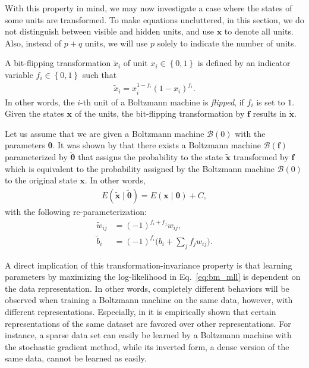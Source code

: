 \documentclass[dissertation,nocontribution,draft*]{aaltoseries}
\newcommand{\vect}[1]{\mathbf{#1}}
\newcommand{\vects}[1]{\boldsymbol{#1}}
\newcommand{\vf}[0]{\vect{f}}
\newcommand{\vx}[0]{\vect{x}}
\newcommand{\TT}[0]{{\vects{\theta}}}
\newcommand{\BB}[0]{\mathcal{B}}
\begin{document}
With this property in mind, we may now investigate a
case where the states of some units are transformed. To make
equations uncluttered, in this section, we do not
distinguish between visible and hidden units, and use $\vx$
to denote all units. Also, instead of $p+q$ units, we will
use $p$ solely to indicate the number of units.

A bit-flipping transformation $\tilde{x}_i$ of unit $x_i
\in \left\{ 0, 1\right\}$ is defined by an indicator
variable $f_i \in \left\{ 0, 1\right\}$ such that 
\begin{align*}
    \tilde{x}_i = x_i^{1 - f_i} \left( 1 - x_i\right)^{f_i}.
\end{align*}
In other words, the $i$-th unit of a Boltzmann machine is
\textit{flipped}, if $f_i$ is set to $1$. Given the states
$\vx$ of the units, the bit-flipping transformation by $\vf$
results in $\tilde{\vx}$.

Let us assume that we are given a Boltzmann machine $\BB(0)$
with the parameters $\TT$. It was shown by \citet{Cho2013nc}
that there exists a Boltzmann machine $\BB(\vf)$
parameterized by $\tilde{\TT}$ that assigns the probability
to the state $\tilde{\vx}$ transformed by $\vf$ which is
equivalent to the probability assigned by the Boltzmann
machine $\BB(0)$ to the original state $\vx$. In other words,
\begin{align*}
    E(\tilde{\vx} \mid \tilde{\TT})  = E(\vx \mid \TT) + C,
\end{align*}
with the following re-parameterization:
\begin{align}
     \label{eq:bm_tilde_w}
     \tilde{w}_{ij} &= (-1)^{f_i+f_j}w_{ij},
 \\
     \label{eq:bm_tilde_b}
     \tilde{b}_i &= (-1)^{f_i}\biggl(b_i + \sum_j f_j w_{ij}
     \biggr).
\end{align}

A direct implication of this transformation-invariance
property is that learning parameters by maximizing the
log-likelihood in Eq.~\eqref{eq:bm_mll} is dependent on the
data representation. In other words, completely different
behaviors will be observed when training a Boltzmann machine
on the same data, however, with different representations.
Especially, in  it is empirically shown that
certain representations of the same dataset are favored over
other representations. For instance, a sparse data set can
easily be learned by a Boltzmann machine with the stochastic
gradient method, while its inverted form, a dense version of
the same data, cannot be learned as easily.
\end{document}

